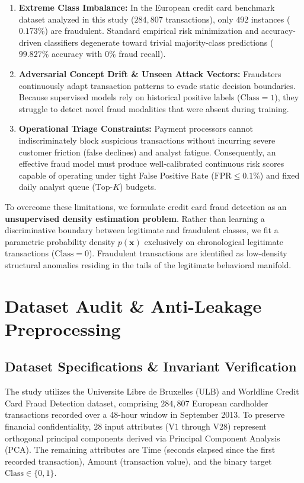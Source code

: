 \documentclass[11pt, a4paper]{article}
\begin{document}
\begin{enumerate}
    \item \textbf{Extreme Class Imbalance:} In the European credit card benchmark dataset analyzed in this study ($284,807$ transactions), only $492$ instances ($0.173\%$) are fraudulent. Standard empirical risk minimization and accuracy-driven classifiers degenerate toward trivial majority-class predictions ($99.827\%$ accuracy with $0\%$ fraud recall).
    \item \textbf{Adversarial Concept Drift \& Unseen Attack Vectors:} Fraudsters continuously adapt transaction patterns to evade static decision boundaries. Because supervised models rely on historical positive labels ($\text{Class} = 1$), they struggle to detect novel fraud modalities that were absent during training.
    \item \textbf{Operational Triage Constraints:} Payment processors cannot indiscriminately block suspicious transactions without incurring severe customer friction (false declines) and analyst fatigue. Consequently, an effective fraud model must produce well-calibrated continuous risk scores capable of operating under tight False Positive Rate ($\text{FPR} \le 0.1\%$) and fixed daily analyst queue ($\text{Top-}K$) budgets.
\end{enumerate}

To overcome these limitations, we formulate credit card fraud detection as an \textbf{unsupervised density estimation problem}. Rather than learning a discriminative boundary between legitimate and fraudulent classes, we fit a parametric probability density $p(\mathbf{x})$ exclusively on chronological legitimate transactions ($\text{Class} = 0$). Fraudulent transactions are identified as low-density structural anomalies residing in the tails of the legitimate behavioral manifold.

\section{Dataset Audit \& Anti-Leakage Preprocessing}

\subsection{Dataset Specifications \& Invariant Verification}
The study utilizes the Universite Libre de Bruxelles (ULB) and Worldline Credit Card Fraud Detection dataset, comprising $284,807$ European cardholder transactions recorded over a 48-hour window in September 2013. To preserve financial confidentiality, $28$ input attributes ($\text{V1}$ through $\text{V28}$) represent orthogonal principal components derived via Principal Component Analysis (PCA). The remaining attributes are $\text{Time}$ (seconds elapsed since the first recorded transaction), $\text{Amount}$ (transaction value), and the binary target $\text{Class} \in \{0, 1\}$.
\end{document}
